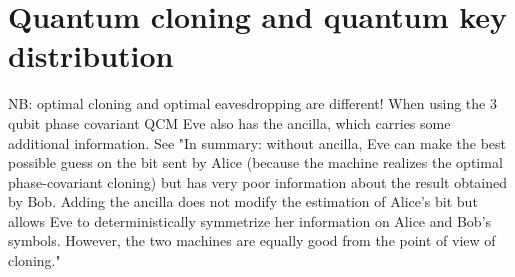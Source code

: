 \section{Quantum cloning and quantum key distribution}

NB: optimal cloning and optimal eavesdropping are different!
When using the 3 qubit phase covariant QCM Eve also has the ancilla, which carries some additional information. See \cite{QuantumCloningReviewScarani}
"In summary: without ancilla, Eve can make the best possible guess on the bit sent by Alice (because the machine realizes the optimal phase-covariant cloning) but has very poor information about the result obtained by Bob. 
Adding the ancilla does not modify the estimation of Alice’s bit but allows Eve to deterministically symmetrize her information on Alice and Bob’s symbols. 
However, the two machines are equally good from the point of view of cloning."